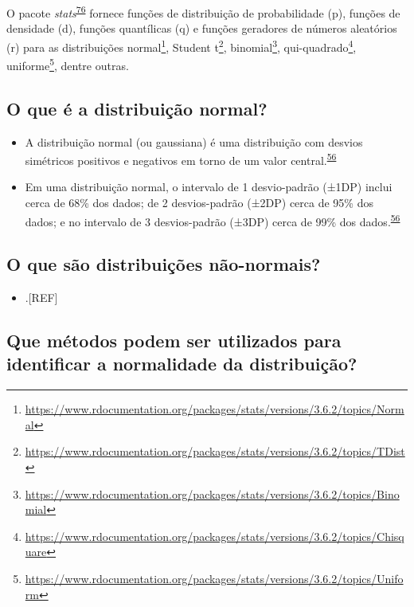 \documentclass[
  a4paper,
]{book}
\providecommand{\tightlist}{%
  \setlength{\itemsep}{0pt}\setlength{\parskip}{0pt}}
\renewcommand{\href}[2]{#2\footnote{\url{#1}}}
\newenvironment{infobox}[1]
  {
  \begin{itemize}
  \renewcommand{\labelitemi}{
    \raisebox{-.7\height}[0pt][0pt]{
      {\setkeys{Gin}{width=3em,keepaspectratio}
        \texttt{[image: \#1]}}
    }
  }
  \setlength{\fboxsep}{1em}
  \begin{blackbox}
  \item
  }
  {
  \end{blackbox}
  \end{itemize}
  }
\begin{document}
\begin{infobox}{images/Rlogo}
O pacote \emph{stats}\textsuperscript{\protect\hyperlink{ref-stats-3}{76}} fornece funções de distribuição de probabilidade (p), funções de densidade (d), funções quantílicas (q) e funções geradores de números aleatórios (r) para as distribuições \href{https://www.rdocumentation.org/packages/stats/versions/3.6.2/topics/Normal}{normal}, \href{https://www.rdocumentation.org/packages/stats/versions/3.6.2/topics/TDist}{Student t}, \href{https://www.rdocumentation.org/packages/stats/versions/3.6.2/topics/Binomial}{binomial}, \href{https://www.rdocumentation.org/packages/stats/versions/3.6.2/topics/Chisquare}{qui-quadrado}, \href{https://www.rdocumentation.org/packages/stats/versions/3.6.2/topics/Uniform}{uniforme}, dentre outras.

\end{infobox}

\hypertarget{o-que-uxe9-a-distribuiuxe7uxe3o-normal}{%
\subsection{O que é a distribuição normal?}\label{o-que-uxe9-a-distribuiuxe7uxe3o-normal}}

\begin{itemize}
\item
  A distribuição normal (ou gaussiana) é uma distribuição com desvios simétricos positivos e negativos em torno de um valor central.\textsuperscript{\protect\hyperlink{ref-Ali2016}{56}}
\item
  Em uma distribuição normal, o intervalo de 1 desvio-padrão (±1DP) inclui cerca de 68\% dos dados; de 2 desvios-padrão (±2DP) cerca de 95\% dos dados; e no intervalo de 3 desvios-padrão (±3DP) cerca de 99\% dos dados.\textsuperscript{\protect\hyperlink{ref-Ali2016}{56}}
\end{itemize}

\hypertarget{o-que-suxe3o-distribuiuxe7uxf5es-nuxe3o-normais}{%
\subsection{O que são distribuições não-normais?}\label{o-que-suxe3o-distribuiuxe7uxf5es-nuxe3o-normais}}

\begin{itemize}
\tightlist
\item
  .{[}REF{]}
\end{itemize}

\hypertarget{que-muxe9todos-podem-ser-utilizados-para-identificar-a-normalidade-da-distribuiuxe7uxe3o}{%
\subsection{Que métodos podem ser utilizados para identificar a normalidade da distribuição?}\label{que-muxe9todos-podem-ser-utilizados-para-identificar-a-normalidade-da-distribuiuxe7uxe3o}}
\end{document}

